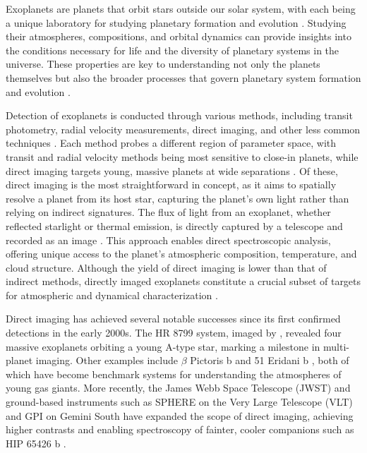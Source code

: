 \documentclass[preprint,longauthor]{aastex631}
\numberwithin{equation}{section}
\begin{document}
Exoplanets are planets that orbit stars outside our solar system, with each being a unique laboratory for studying planetary formation and evolution \citep{kaushikExoplanetDetectionDetailed2025}. Studying their atmospheres, compositions, and orbital dynamics can provide insights into the conditions necessary for life and the diversity of planetary systems in the universe. These properties are key to understanding not only the planets themselves but also the broader processes that govern planetary system formation and evolution \citep{madhusudhanExoplanetaryAtmospheresKey2019}.

Detection of exoplanets is conducted through various methods, including transit photometry, radial velocity measurements, direct imaging, and other less common techniques \citep{weiSurveyExoplanetaryDetection2018}. Each method probes a different region of parameter space, with transit and radial velocity methods being most sensitive to close-in planets, while direct imaging targets young, massive planets at wide separations \citep{fischerExoplanetDetectionTechniques2014b}. Of these, direct imaging is the most straightforward in concept, as it aims to spatially resolve a planet from its host star, capturing the planet’s own light rather than relying on indirect signatures. The flux of light from an exoplanet, whether reflected starlight or thermal emission, is directly captured by a telescope and recorded as an image \citep{kaushikExoplanetDetectionDetailed2025}. This approach enables direct spectroscopic analysis, offering unique access to the planet’s atmospheric composition, temperature, and cloud structure. Although the yield of direct imaging is lower than that of indirect methods, directly imaged exoplanets constitute a crucial subset of targets for atmospheric and dynamical characterization \citep{currieDirectImagingSpectroscopy2023}.

Direct imaging has achieved several notable successes since its first confirmed detections in the early 2000s. The HR 8799 system, imaged by \citet{maroisDirectImagingMultiple2008}, revealed four massive exoplanets orbiting a young A-type star, marking a milestone in multi-planet imaging. Other examples include $\beta$ Pictoris b \citep{lagrangeGiantPlanetImaged2010} and 51 Eridani b \citep{macintoshDiscoverySpectroscopyYoung2015}, both of which have become benchmark systems for understanding the atmospheres of young gas giants. More recently, the James Webb Space Telescope (JWST) and ground-based instruments such as SPHERE on the Very Large Telescope (VLT) and GPI on Gemini South have expanded the scope of direct imaging, achieving higher contrasts and enabling spectroscopy of fainter, cooler companions such as HIP 65426 b \citep{carterJWSTEarlyRelease2023}.
\end{document}
